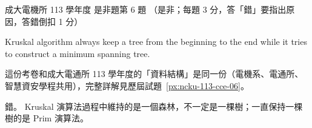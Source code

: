 \begin{pastexam}[label={px:ncku-113-ee-06}]{成大電機所 113 學年度 是非題第 6 題}
（是非；每題 3 分，答「錯」要指出原因，答錯倒扣 1 分）

Kruskal algorithm always keep a tree from the beginning to the end while it tries to construct a
minimum spanning tree.
\end{pastexam}

\begin{pastsoln}
這份考卷和成大電通所 113 學年度的「資料結構」是同一份（電機系、電通所、智慧資安學程共用），完整詳解見歷屆試題~\ref{px:ncku-113-cce-06}。

錯。 Kruskal 演算法過程中維持的是一個森林，不一定是一棵樹；一直保持一棵樹的是 Prim 演算法。
\end{pastsoln}
